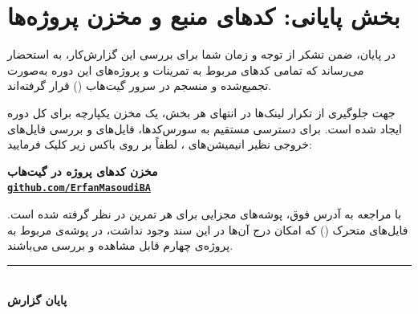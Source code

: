 
\newpage
\section*{بخش پایانی: کدهای منبع و مخزن پروژه‌ها}

\vspace{0.5cm}
در پایان، ضمن تشکر از توجه و زمان شما برای بررسی این گزارش‌کار، به استحضار می‌رساند که تمامی کدهای مربوط به تمرینات و پروژه‌های این دوره به‌صورت تجمیع‌شده و منسجم در سرور گیت‌هاب () قرار گرفته‌اند. 

جهت جلوگیری از تکرار لینک‌ها در انتهای هر بخش، یک مخزن یکپارچه برای کل دوره ایجاد شده است. برای دسترسی مستقیم به سورس‌کدها، فایل‌های  و بررسی فایل‌های خروجی نظیر انیمیشن‌های ، لطفاً بر روی باکس زیر کلیک فرمایید:

\vspace{1.5cm}
\begin{center}
    \begin{tcolorbox}[
        enhanced jigsaw,
        colback=lightbg,
        colframe=MCIblue,
        boxrule=1.5pt,
        arc=4mm,
        width=0.75\textwidth,
        halign=center,
        valign=center,
        top=25pt, bottom=25pt,
        drop fuzzy shadow
    ]
        {\LARGE \textcolor{textgray}{\faGithub} \textbf{\textcolor{primary}{مخزن کدهای پروژه در گیت‌هاب}}}\\[0.6cm]
        {\Large \href{https://github.com/ErfanMasoudiBA}{\textbf{\textcolor{MCIblue}{\texttt{github.com/ErfanMasoudiBA}}}}}
    \end{tcolorbox}
\end{center}
\vspace{1.5cm}

\begin{tipbox}
با مراجعه به آدرس فوق، پوشه‌های مجزایی برای هر تمرین در نظر گرفته شده است. فایل‌های متحرک () که امکان درج آن‌ها در این سند  وجود نداشت، در پوشه‌ی مربوط به پروژه‌ی چهارم قابل مشاهده و بررسی می‌باشند.
\end{tipbox}

\vfill
\begin{center}
    \textcolor{MCIorange}{\rule{4cm}{2pt}} \\[0.3cm]
    \large\textbf{\textcolor{primary}{پایان گزارش}}
\end{center}
\vspace{1cm}